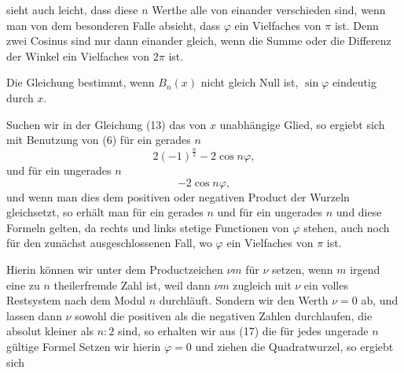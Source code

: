 sieht auch leicht, dass diese $n$ Werthe alle von einander verschieden sind, wenn man von dem besonderen Falle absieht, dass $\varphi$ ein Vielfaches von $\pi$ ist. Denn zwei Cosinus sind nur dann einander gleich, wenn die Summe oder die Differenz der Winkel ein Vielfaches von $2\pi$ ist.

Die Gleichung
bestimmt, wenn $B_n(x)$ nicht gleich Null ist, $\sin\varphi$ eindeutig durch $x$.

Suchen wir in der Gleichung (13) das von $x$ unabhängige Glied, so ergiebt sich mit Benutzung von (6) für ein gerades $n$
\[
2(-1)^{\frac{n}{2}} - 2\cos n\varphi,
\]
und für ein ungerades $n$
\[
-2\cos n\varphi,
\]
und wenn man dies dem positiven oder negativen Product der Wurzeln gleichsetzt, so erhält man für ein gerades $n$
und für ein ungerades $n$
und diese Formeln gelten, da rechts und links stetige Functionen von $\varphi$ stehen, auch noch für den zunächst ausgeschlossenen Fall, wo $\varphi$ ein Vielfaches von $\pi$ ist.

Hierin können wir unter dem Productzeichen $\nu m$ für $\nu$ setzen, wenn $m$ irgend eine zu $n$ theilerfremde Zahl ist, weil dann $\nu m$ zugleich mit $\nu$ ein volles Restsystem nach dem Modul $n$ durchläuft. Sondern wir den Werth $\nu=0$ ab, und lassen dann $\nu$ sowohl die positiven als die negativen Zahlen durchlaufen, die absolut kleiner als $n:2$ sind, so erhalten wir aus (17) die für jedes ungerade $n$ gültige Formel
Setzen wir hierin $\varphi = 0$ und ziehen die Quadratwurzel, so ergiebt sich
